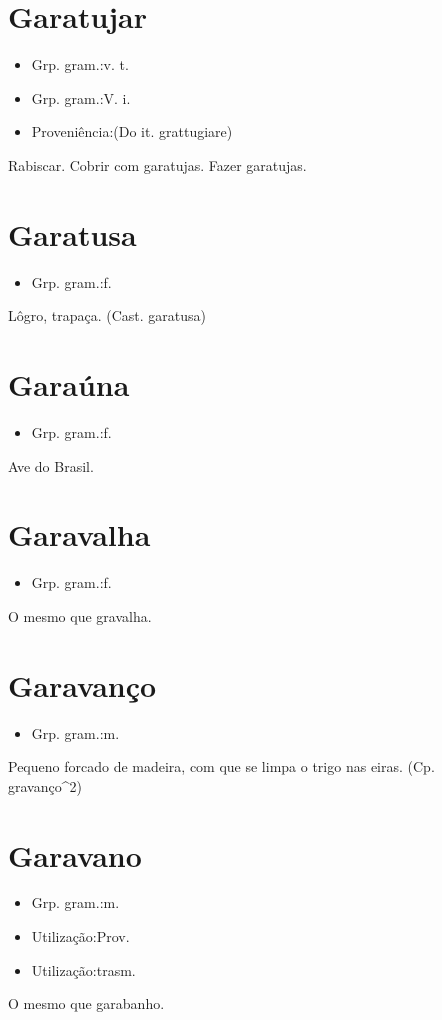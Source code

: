 \section{Garatujar}
\begin{itemize}
\item {Grp. gram.:v. t.}
\end{itemize}
\begin{itemize}
\item {Grp. gram.:V. i.}
\end{itemize}
\begin{itemize}
\item {Proveniência:(Do it. \textunderscore grattugiare\textunderscore )}
\end{itemize}
Rabiscar.
Cobrir com garatujas.
Fazer garatujas.
\section{Garatusa}
\begin{itemize}
\item {Grp. gram.:f.}
\end{itemize}
Lôgro, trapaça.
(Cast. \textunderscore garatusa\textunderscore )
\section{Garaúna}
\begin{itemize}
\item {Grp. gram.:f.}
\end{itemize}
Ave do Brasil.
\section{Garavalha}
\begin{itemize}
\item {Grp. gram.:f.}
\end{itemize}
O mesmo que \textunderscore gravalha\textunderscore .
\section{Garavanço}
\begin{itemize}
\item {Grp. gram.:m.}
\end{itemize}
Pequeno forcado de madeira, com que se limpa o trigo nas eiras.
(Cp. \textunderscore gravanço\textunderscore ^2)
\section{Garavano}
\begin{itemize}
\item {Grp. gram.:m.}
\end{itemize}
\begin{itemize}
\item {Utilização:Prov.}
\end{itemize}
\begin{itemize}
\item {Utilização:trasm.}
\end{itemize}
O mesmo que \textunderscore garabanho\textunderscore .
